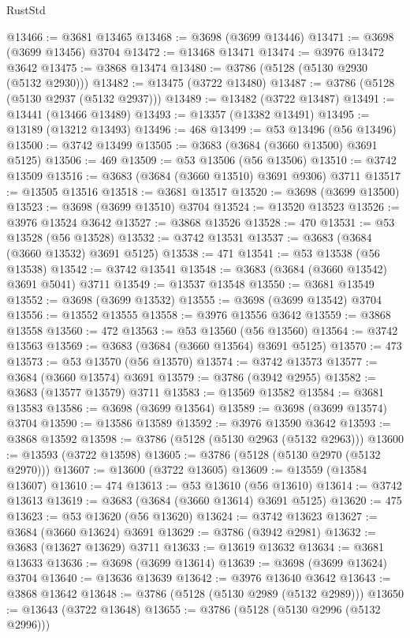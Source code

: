 \begin{lexlean}{RustStd}
\begin{coremodule}
{\begin{coremodule}
{{{{{{{{{{{{{{{{{{{{{{{{{{{{{{{{{{{{{{{{{{{{{{{@13466 := @3681 @13465
@13468 := @3698 (@3699 @13446)
@13471 := @3698 (@3699 @13456) @3704
@13472 := @13468 @13471
@13474 := @3976 @13472 @3642
@13475 := @3868 @13474
@13480 := @3786 (@5128 (@5130 @2930 (@5132 @2930)))
@13482 := @13475 (@3722 @13480)
@13487 := @3786 (@5128 (@5130 @2937 (@5132 @2937)))
@13489 := @13482 (@3722 @13487)
@13491 := @13441 (@13466 @13489)
@13493 := @13357 (@13382 @13491)
@13495 := @13189 (@13212 @13493)
@13496 := 468
@13499 := @53 @13496 (@56 @13496)
@13500 := @3742 @13499
@13505 := @3683 (@3684 (@3660 @13500) @3691 @5125)
@13506 := 469
@13509 := @53 @13506 (@56 @13506)
@13510 := @3742 @13509
@13516 := @3683 (@3684 (@3660 @13510) @3691 @9306) @3711
@13517 := @13505 @13516
@13518 := @3681 @13517
@13520 := @3698 (@3699 @13500)
@13523 := @3698 (@3699 @13510) @3704
@13524 := @13520 @13523
@13526 := @3976 @13524 @3642
@13527 := @3868 @13526
@13528 := 470
@13531 := @53 @13528 (@56 @13528)
@13532 := @3742 @13531
@13537 := @3683 (@3684 (@3660 @13532) @3691 @5125)
@13538 := 471
@13541 := @53 @13538 (@56 @13538)
@13542 := @3742 @13541
@13548 := @3683 (@3684 (@3660 @13542) @3691 @5041) @3711
@13549 := @13537 @13548
@13550 := @3681 @13549
@13552 := @3698 (@3699 @13532)
@13555 := @3698 (@3699 @13542) @3704
@13556 := @13552 @13555
@13558 := @3976 @13556 @3642
@13559 := @3868 @13558
@13560 := 472
@13563 := @53 @13560 (@56 @13560)
@13564 := @3742 @13563
@13569 := @3683 (@3684 (@3660 @13564) @3691 @5125)
@13570 := 473
@13573 := @53 @13570 (@56 @13570)
@13574 := @3742 @13573
@13577 := @3684 (@3660 @13574) @3691
@13579 := @3786 (@3942 @2955)
@13582 := @3683 (@13577 @13579) @3711
@13583 := @13569 @13582
@13584 := @3681 @13583
@13586 := @3698 (@3699 @13564)
@13589 := @3698 (@3699 @13574) @3704
@13590 := @13586 @13589
@13592 := @3976 @13590 @3642
@13593 := @3868 @13592
@13598 := @3786 (@5128 (@5130 @2963 (@5132 @2963)))
@13600 := @13593 (@3722 @13598)
@13605 := @3786 (@5128 (@5130 @2970 (@5132 @2970)))
@13607 := @13600 (@3722 @13605)
@13609 := @13559 (@13584 @13607)
@13610 := 474
@13613 := @53 @13610 (@56 @13610)
@13614 := @3742 @13613
@13619 := @3683 (@3684 (@3660 @13614) @3691 @5125)
@13620 := 475
@13623 := @53 @13620 (@56 @13620)
@13624 := @3742 @13623
@13627 := @3684 (@3660 @13624) @3691
@13629 := @3786 (@3942 @2981)
@13632 := @3683 (@13627 @13629) @3711
@13633 := @13619 @13632
@13634 := @3681 @13633
@13636 := @3698 (@3699 @13614)
@13639 := @3698 (@3699 @13624) @3704
@13640 := @13636 @13639
@13642 := @3976 @13640 @3642
@13643 := @3868 @13642
@13648 := @3786 (@5128 (@5130 @2989 (@5132 @2989)))
@13650 := @13643 (@3722 @13648)
@13655 := @3786 (@5128 (@5130 @2996 (@5132 @2996)))
}}}}}}}}}}}}}}}}}}}}}}}}}}}}}}}}}}}}}}}}}}}}}}}
\end{coremodule}}
\end{coremodule}
\end{lexlean}
